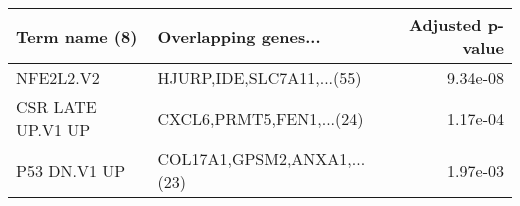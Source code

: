 \begin{tabular}{llr}
\toprule
    Term name (8) &        Overlapping genes... &  Adjusted p-value \\
\midrule
        NFE2L2.V2 &   HJURP,IDE,SLC7A11,...(55) &          9.34e-08 \\
CSR LATE UP.V1 UP &    CXCL6,PRMT5,FEN1,...(24) &          1.17e-04 \\
     P53 DN.V1 UP & COL17A1,GPSM2,ANXA1,...(23) &          1.97e-03 \\
\bottomrule
\end{tabular}
